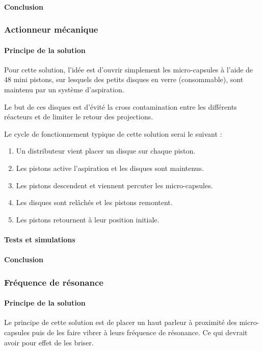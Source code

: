 \paragraph{Conclusion}


\newpage
\subsubsection{Actionneur mécanique}
\paragraph{Principe de la solution}
Pour cette solution, l'idée est d'ouvrir simplement les micro-capsules à l'aide de 48 mini pistons, 
sur lesquels des petits disques en verre (consommable), sont maintenu par un système d'aspiration.

\vspace{0.3cm}
Le but de ces disques est d'évité la cross contamination entre les différents réacteurs et de limiter le retour 
des projections.

\vspace{0.3cm}
Le cycle de fonctionnement typique de cette solution serai le suivant :
\begin{enumerate}
    \item Un distributeur vient placer un disque sur chaque piston.
    \item Les pistons active l'aspiration et les disques sont maintenus.
    \item Les pistons descendent et viennent percuter les micro-capsules.
    \item Les disques sont relâchés et les pistons remontent.
    \item Les pistons retournent à leur position initiale.
\end{enumerate}

\paragraph{Tests et simulations}

\paragraph{Conclusion}

\subsubsection{Fréquence de résonance}
\paragraph{Principe de la solution}
Le principe de cette solution est de placer un haut parleur à proximité des micro-capsules puis de les faire vibrer à leurs fréquence de résonance.
Ce qui devrait avoir pour effet de les briser.


